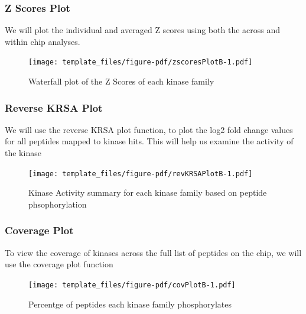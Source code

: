 \documentclass[
  letterpaper,
  DIV=11,
  numbers=noendperiod]{scrreport}
\begin{document}
\hypertarget{z-scores-plot-1}{%
\subsubsection{Z Scores Plot}\label{z-scores-plot-1}}

We will plot the individual and averaged Z scores using both the across
and within chip analyses.

\begin{figure}[htbp]

{\centering \texttt{[image: template\_files/figure-pdf/zscoresPlotB-1.pdf]}

}

\caption{Waterfall plot of the Z Scores of each kinase family}

\end{figure}

\hypertarget{reverse-krsa-plot-1}{%
\subsubsection{Reverse KRSA Plot}\label{reverse-krsa-plot-1}}

We will use the reverse KRSA plot function, to plot the log2 fold change
values for all peptides mapped to kinase hits. This will help us examine
the activity of the kinase

\begin{figure}[htbp]

{\centering \texttt{[image: template\_files/figure-pdf/revKRSAPlotB-1.pdf]}

}

\caption{Kinase Activity summary for each kinase family based on peptide
phsophorylation}

\end{figure}

\hypertarget{coverage-plot-1}{%
\subsubsection{Coverage Plot}\label{coverage-plot-1}}

To view the coverage of kinases across the full list of peptides on the
chip, we will use the coverage plot function

\begin{figure}[htbp]

{\centering \texttt{[image: template\_files/figure-pdf/covPlotB-1.pdf]}

}

\caption{Percentge of peptides each kinase family phosphorylates}

\end{figure}
\end{document}
